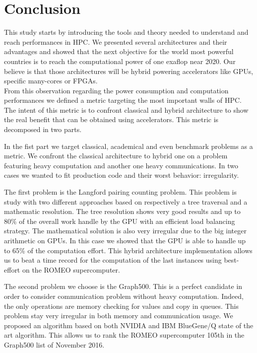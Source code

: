 \chapter*{Conclusion}
This study starts by introducing the tools and theory needed to understand and reach performances in HPC. 
We presented several architectures and their advantages and showed that the next objective for the world most powerful countries is to reach the computational power of one exaflop near 2020. 
Our believe is that those architectures will be hybrid powering accelerators like GPUs, specific many-cores or FPGAs. \\

From this observation regarding the power consumption and computation performances we defined a metric targeting the most important walls of HPC. 
The intent of this metric is to confront classical and hybrid architecture to show the real benefit that can be obtained using accelerators. 
This metric is decomposed in two parts. 

In the fist part we target classical, academical and even benchmark problems as a metric. 
We confront the classical architecture to hybrid one on a problem featuring heavy computation and another one heavy communications. 
In two cases we wanted to fit production code and their worst behavior: irregularity. 

The first problem is the Langford pairing counting problem. 
This problem is study with two different approaches based on respectively a tree traversal and a mathematic resolution. 
The tree resolution shows very good results and up to 80\% of the overall work handle by the GPU with an efficient load balancing strategy. 
The mathematical solution is also very irregular due to the big integer arithmetic on GPUs. 
In this case we showed that the GPU is able to handle up to 65\% of the computation effort. 
This hybrid architecture implementation allows us to beat a time record for the computation of the last instances using best-effort on the ROMEO supercomputer. 

The second problem we choose is the Graph500. 
This is a perfect candidate in order to consider communication problem without heavy computation. 
Indeed, the only operations are memory checking for values and copy in queues. 
This problem stay very irregular in both memory and communication usage. 
We proposed an algorithm based on both NVIDIA and IBM BlueGene/Q state of the art algorithm. 
This allows us to rank the ROMEO supercomputer 105th in the Graph500 list of November 2016.\\

